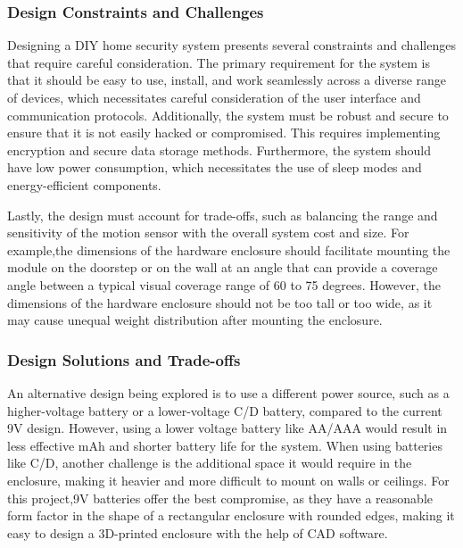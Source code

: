 \subsubsection{Design Constraints and Challenges}

Designing a DIY home security system presents several constraints and challenges that
require careful consideration. %
The primary requirement for the system is that it should be easy to use, install, and work seamlessly across a diverse range of devices, which
necessitates careful consideration of the user interface and communication protocols. %
Additionally, the system must be robust and secure to ensure that it is not easily
hacked or compromised. %
This requires implementing encryption and secure data storage methods. %
Furthermore, the system should have low power consumption, which
necessitates the use of sleep modes and energy-efficient components. %

Lastly, the design must account for trade-offs, such as balancing the range and
sensitivity of the motion sensor with the overall system cost and size.
For example,the dimensions of the hardware enclosure should facilitate mounting the module on the
doorstep or on the wall at an angle that can provide a coverage angle between a
typical visual coverage range of 60 to 75 degrees. %
However, the dimensions of the hardware enclosure should not be too tall or too wide, as it may cause unequal weight
distribution after mounting the enclosure. %

\subsubsection{Design Solutions and Trade-offs}

An alternative design being explored is to use a different power source,
such as a higher-voltage battery or a lower-voltage C/D battery, compared to the
current 9V design. %
However, using a lower voltage battery like AA/AAA would result in less effective mAh and shorter battery life for the system. %
When using batteries like C/D, another challenge is the additional space it would require in the enclosure,
making it heavier and more difficult to mount on walls or ceilings. %
For this project,9V batteries offer the best compromise, as they have a reasonable form factor in the
shape of a rectangular enclosure with rounded edges, making it easy to design a
3D-printed enclosure with the help of CAD software. %

